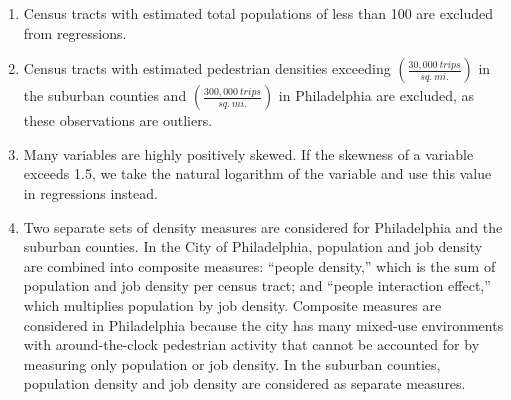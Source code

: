 \documentclass[paper=letterpaper, fontsize=11pt]{scrartcl}
\begin{document}
\begin{enumerate}[itemsep=-4pt]
	\item Census tracts with estimated total populations of less than 100 are excluded from regressions.
	\item Census tracts with estimated pedestrian densities exceeding $\left(\frac{30,000\:trips}{sq.\:mi.}\right)$ in the suburban counties and $\left(\frac{300,000\:trips}{sq.\:mi.}\right)$ in Philadelphia are excluded, as these observations are outliers.
	\item Many variables are highly positively skewed. If the skewness of a variable exceeds 1.5, we take the natural logarithm of the variable and use this value in regressions instead.
	\item Two separate sets of density measures are considered for Philadelphia and the suburban counties. In the City of Philadelphia, population and job density are combined into composite measures: ``people density,'' which is the sum of population and job density per census tract; and ``people interaction effect,'' which multiplies population by job density. Composite measures are considered in Philadelphia because the city has many mixed-use environments with around-the-clock pedestrian activity that cannot be accounted for by measuring only population or job density. In the suburban counties, population density and job density are considered as separate measures.
\end{enumerate}
\end{document}
